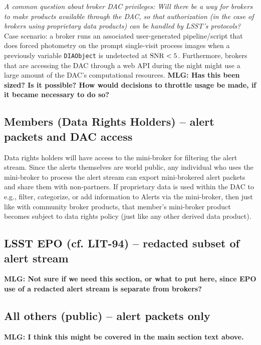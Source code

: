 {\it A common question about broker DAC privileges: Will there be a way for brokers to make products available through the DAC, so that authorization (in the case of brokers using proprietary data products) can be handled by LSST's protocols?} Case scenario: a broker runs an associated user-generated pipeline/script that does forced photometry on the prompt single-visit process images when a previously variable {\tt DIAObject} is undetected at ${\rm SNR}<5$.
Furthermore, brokers that are accessing the DAC through a web API during the night might use a large amount of the DAC's computational resources.
{\bf MLG: Has this been sized?
Is it possible?
How would decisions to throttle usage be made, if it became necessary to do so?}


\subsection{Members (Data Rights Holders) -- alert packets and DAC access}

Data rights holders will have access to the mini-broker for filtering the alert stream.
Since the alerts themselves are world public, any individual who uses the mini-broker to process the alert stream can export mini-brokered alert packets and share them with non-partners.
If proprietary data is used within the DAC to e.g., filter, categorize, or add information to Alerts via the mini-broker, then just like with community broker products, that member's mini-broker product becomes subject to data rights policy (just like any other derived data product).



\subsection{LSST EPO (cf. LIT-94) -- redacted subset of alert stream}
{\bf MLG: Not sure if we need this section, or what to put here, since EPO use of a redacted alert stream is separate from brokers?}

\subsection{All others (public) -- alert packets only}


{\bf MLG: I think this might be covered in the main section text above.}


